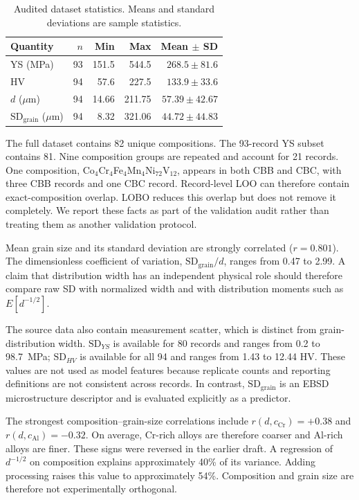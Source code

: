 \documentclass[a4paper,11pt]{article}
\begin{document}
\begin{table}[H]
\centering
\caption{Audited dataset statistics. Means and standard deviations are sample statistics.}
\label{tab:data}
\begin{tabular}{lrrrr}
\toprule
Quantity & $n$ & Min & Max & Mean $\pm$ SD \\
\midrule
YS (MPa) & 93 & 151.5 & 544.5 & $268.5\pm81.6$ \\
HV & 94 & 57.6 & 227.5 & $133.9\pm33.6$ \\
$d$ ($\mu$m) & 94 & 14.66 & 211.75 & $57.39\pm42.67$ \\
$\mathrm{SD}_{\mathrm{grain}}$ ($\mu$m) & 94 & 8.32 & 321.06 & $44.72\pm44.83$ \\
\bottomrule
\end{tabular}
\end{table}

The full dataset contains 82 unique compositions. The 93-record YS subset contains 81. Nine composition groups are repeated and account for 21 records. One composition, Co$_4$Cr$_4$Fe$_4$Mn$_4$Ni$_{72}$V$_{12}$, appears in both CBB and CBC, with three CBB records and one CBC record. Record-level LOO can therefore contain exact-composition overlap. LOBO reduces this overlap but does not remove it completely. We report these facts as part of the validation audit rather than treating them as another validation protocol.

Mean grain size and its standard deviation are strongly correlated ($r=0.801$). The dimensionless coefficient of variation, $\mathrm{SD}_{\mathrm{grain}}/d$, ranges from 0.47 to 2.99. A claim that distribution width has an independent physical role should therefore compare raw SD with normalized width and with distribution moments such as $E[d^{-1/2}]$.

The source data also contain measurement scatter, which is distinct from grain-distribution width. $\mathrm{SD}_{YS}$ is available for 80 records and ranges from 0.2 to \SI{98.7}{MPa}; $\mathrm{SD}_{HV}$ is available for all 94 and ranges from 1.43 to 12.44 HV. These values are not used as model features because replicate counts and reporting definitions are not consistent across records. In contrast, $\mathrm{SD}_{\mathrm{grain}}$ is an EBSD microstructure descriptor and is evaluated explicitly as a predictor.

The strongest composition--grain-size correlations include $r(d,c_{\mathrm{Cr}})=+0.38$ and $r(d,c_{\mathrm{Al}})=-0.32$. On average, Cr-rich alloys are therefore coarser and Al-rich alloys are finer. These signs were reversed in the earlier draft. A regression of $d^{-1/2}$ on composition explains approximately 40\% of its variance. Adding processing raises this value to approximately 54\%. Composition and grain size are therefore not experimentally orthogonal.
\end{document}

